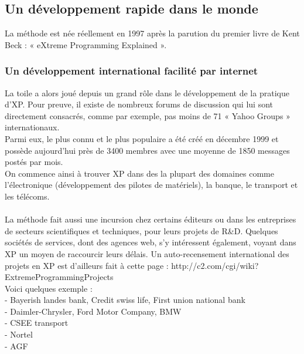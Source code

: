 \documentclass[]{article}
\begin{document}
\hypertarget{un-duxe9veloppement-rapide-dans-le-monde}{%
\subsection{\texorpdfstring{\textbf{Un développement rapide dans le
monde}}{Un développement rapide dans le monde}}\label{un-duxe9veloppement-rapide-dans-le-monde}}

La méthode est née réellement en 1997 après la parution du premier livre
de Kent Beck : « eXtreme Programming Explained ».



\hypertarget{un-duxe9veloppement-international-facilituxe9-par-internet}{%
\subsubsection{Un développement international facilité par
internet}\label{un-duxe9veloppement-international-facilituxe9-par-internet}}

La toile a alors joué depuis un grand rôle dans le développement de la
pratique d'XP. Pour preuve, il existe de nombreux forums de discussion
qui lui sont directement consacrés, comme par exemple, pas moins de 71 «
Yahoo Groups » internationaux.\\
Parmi eux, le plus connu et le plus populaire a été créé en décembre
1999 et possède aujourd'hui près de 3400 membres avec une moyenne de
1850 messages postés par mois.~\\
On commence ainsi à trouver XP dans des la plupart des domaines comme
l'électronique (développement des pilotes de matériels), la banque, le
transport et les télécoms.~\\
~\\
La méthode fait aussi une incursion chez certains éditeurs ou dans les
entreprises de secteurs scientifiques et techniques, pour leurs projets
de R\&D. Quelques sociétés de services, dont des agences web, s'y
intéressent également, voyant dans XP un moyen de raccourcir leurs
délais. Un auto-recensement international des projets en XP est
d'ailleurs fait à cette page :
http://c2.com/cgi/wiki?ExtremeProgrammingProjects\\
Voici quelques exemple :\\
- Bayerish landes bank, Credit swiss life, First union national bank\\
- Daimler-Chrysler, Ford Motor Company, BMW\\
- CSEE transport\\
- Nortel\\
- AGF
\end{document}
